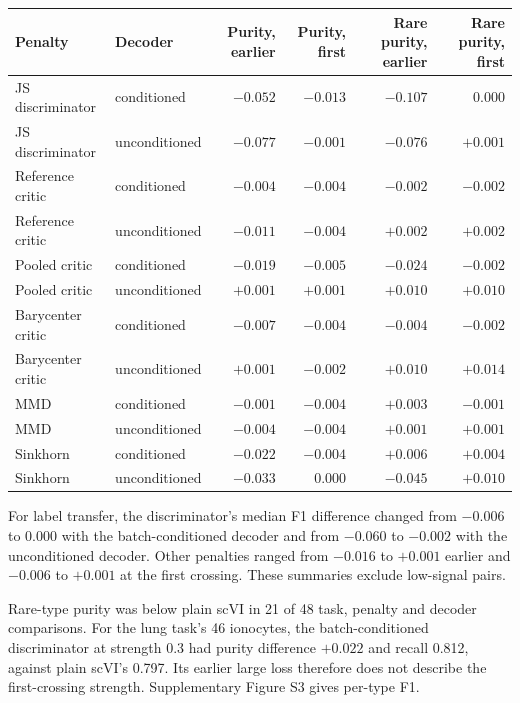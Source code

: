{\scriptsize\begin{tabular}{@{}llrrrr@{}}
\toprule
Penalty & Decoder & Purity, earlier & Purity, first & Rare purity, earlier & Rare purity, first \\
\midrule
JS discriminator & conditioned & $-0.052$ & $-0.013$ & $-0.107$ & $0.000$ \\
JS discriminator & unconditioned & $-0.077$ & $-0.001$ & $-0.076$ & $+0.001$ \\
Reference critic & conditioned & $-0.004$ & $-0.004$ & $-0.002$ & $-0.002$ \\
Reference critic & unconditioned & $-0.011$ & $-0.004$ & $+0.002$ & $+0.002$ \\
Pooled critic & conditioned & $-0.019$ & $-0.005$ & $-0.024$ & $-0.002$ \\
Pooled critic & unconditioned & $+0.001$ & $+0.001$ & $+0.010$ & $+0.010$ \\
Barycenter critic & conditioned & $-0.007$ & $-0.004$ & $-0.004$ & $-0.002$ \\
Barycenter critic & unconditioned & $+0.001$ & $-0.002$ & $+0.010$ & $+0.014$ \\
MMD & conditioned & $-0.001$ & $-0.004$ & $+0.003$ & $-0.001$ \\
MMD & unconditioned & $-0.004$ & $-0.004$ & $+0.001$ & $+0.001$ \\
Sinkhorn & conditioned & $-0.022$ & $-0.004$ & $+0.006$ & $+0.004$ \\
Sinkhorn & unconditioned & $-0.033$ & $0.000$ & $-0.045$ & $+0.010$ \\
\bottomrule\end{tabular}}

\noindent For label transfer, the discriminator's median F1 difference changed from $-0.006$ to 0.000 with the batch-conditioned decoder and from $-0.060$ to $-0.002$ with the unconditioned decoder. Other penalties ranged from $-0.016$ to $+0.001$ earlier and $-0.006$ to $+0.001$ at the first crossing. These summaries exclude low-signal pairs.

Rare-type purity was below plain scVI in 21 of 48 task, penalty and decoder comparisons. For the lung task's 46 ionocytes, the batch-conditioned discriminator at strength 0.3 had purity difference $+0.022$ and recall 0.812, against plain scVI's 0.797. Its earlier large loss therefore does not describe the first-crossing strength. Supplementary Figure S3 gives per-type F1.
\par\endgroup

